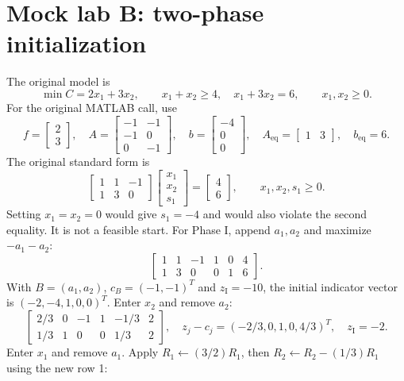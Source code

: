 \documentclass[11pt,a4paper]{article}
\begin{document}
\clearpage
\section{Mock lab B: two-phase initialization}
The original model is
\[
  \min C=2x_1+3x_2,\qquad x_1+x_2\geq4,\quad x_1+3x_2=6,
  \qquad x_1,x_2\geq0.
\]
For the original MATLAB call, use
\[
  f=\begin{bmatrix}2\\3\end{bmatrix},\quad
  A=\begin{bmatrix}-1&-1\\-1&0\\0&-1\end{bmatrix},\quad
  b=\begin{bmatrix}-4\\0\\0\end{bmatrix},\quad
  A_{\mathrm{eq}}=\begin{bmatrix}1&3\end{bmatrix},\quad b_{\mathrm{eq}}=6.
\]
The original standard form is
\[
  \begin{bmatrix}1&1&-1\\1&3&0\end{bmatrix}
  \begin{bmatrix}x_1\\x_2\\s_1\end{bmatrix}
  =\begin{bmatrix}4\\6\end{bmatrix},\qquad x_1,x_2,s_1\geq0.
\]
Setting $x_1=x_2=0$ would give $s_1=-4$ and would also violate the
second equality. It is not a feasible start. For Phase I, append $a_1,a_2$
and maximize $-a_1-a_2$:
\[
  \left[\begin{array}{rrrrr|r}
      1&1&-1&1&0&4\\1&3&0&0&1&6
    \end{array}\right].
\]
With $B=(a_1,a_2)$, $c_B=(-1,-1)^T$ and $z_{\mathrm I}=-10$, the initial
indicator vector is $(-2,-4,1,0,0)^T$. Enter $x_2$ and remove $a_2$:
\[
  \left[\begin{array}{rrrrr|r}
      2/3&0&-1&1&-1/3&2\\1/3&1&0&0&1/3&2
    \end{array}\right],\quad
  z_j-c_j=(-2/3,0,1,0,4/3)^T,\quad z_{\mathrm I}=-2.
\]
Enter $x_1$ and remove $a_1$. Apply $R_1\leftarrow(3/2)R_1$, then
$R_2\leftarrow R_2-(1/3)R_1$ using the new row 1:
\end{document}
